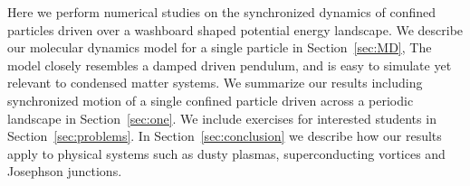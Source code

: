 \documentclass[twocolumn,preprintnumbers,amsmath,amssymb,aps,prx]{revtex4}
\begin{document}
Here we perform numerical studies 
on the synchronized dynamics
of confined particles driven over
a washboard shaped potential energy landscape.
We describe
our molecular dynamics model for a single particle in Section~\ref{sec:MD},
The model
closely resembles
a damped driven pendulum,
and is easy to simulate yet relevant
to condensed matter systems.
We summarize
our results 
including synchronized motion of a single confined particle
driven across a periodic landscape in 
Section~\ref{sec:one}.
We include 
exercises for interested students 
in Section~\ref{sec:problems}.
In Section~\ref{sec:conclusion}
we describe how our results apply 
to physical systems
such as dusty plasmas, superconducting vortices and Josephson junctions.
\end{document}
